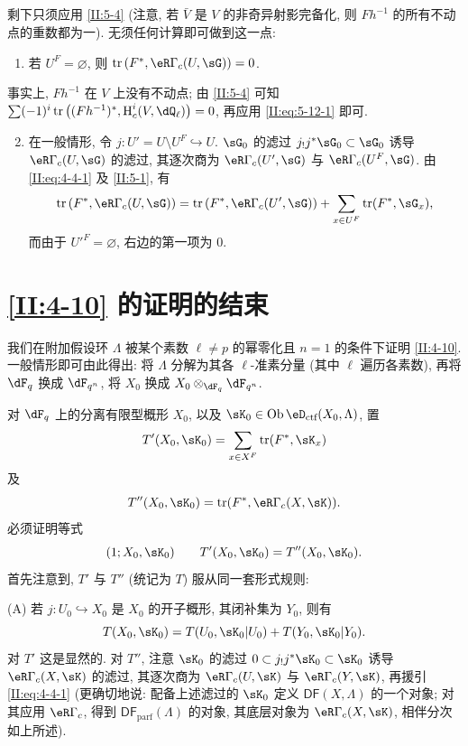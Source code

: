 \subsection{}\label{II:5-13}

剩下只须应用 \ref{II:5-4} (注意, 若 $\bar V$ 是 $V$ 的非奇异射影完备化, 则 $F h^{-1}$ 的所有不动点的重数都为一). 无须任何计算即可做到这一点:
\begin{enumerate}[\indent A.]
  \item 若 $U^F=\varnothing$, 则 $\tr\left(F^*,\eR\Gamma_c(U,\sG)\right) = 0$. \end{enumerate}

事实上, $F h^{-1}$ 在 $V$ 上没有不动点; 由 \ref{II:5-4} 可知 $\sum (-1)^i \tr\left((F h^{-1})^*,\h_c^i(V,\dQ_\ell)\right)=0$, 再应用 \eqref{II:eq:5-12-1} 即可.
\begin{enumerate}[\indent A.]
\setcounter{enumi}{1}
  \item 在一般情形, 令 $j:U'=U\setminus U^F\hookrightarrow U$. $\sG_0$ 的滤过 $j_! j^* \sG_0\subset \sG_0$ 诱导 $\eR\Gamma_c(U,\sG)$ 的滤过, 其逐次商为 $\eR\Gamma_c(U',\sG)$ 与 $\eR\Gamma_c(U^F,\sG)$. 由 \eqref{II:eq:4-4-1} 及 \ref{II:5-1}, 有
    \[
      \tr\left(F^*,\eR\Gamma_c(U,\sG)\right) = \tr\left(F^*,\eR\Gamma_c(U',\sG)\right) + \sum_{x\in U^F} \tr(F^*,\sG_x) \text{,}
    \]
    而由于 ${U'}^F=\varnothing$, 右边的第一项为 $0$.
\end{enumerate}

\section{\ref{II:4-10} 的证明的结束}\label{II:6}

我们在附加假设环 $\Lambda$ 被某个素数 $\ell\ne p$ 的幂零化且 $n=1$ 的条件下证明 \ref{II:4-10}. 一般情形即可由此得出: 将 $\Lambda$ 分解为其各 $\ell$-准素分量 (其中 $\ell$ 遍历各素数), 再将 $\dF_q$ 换成 $\dF_{q^n}$, 将 $X_0$ 换成 $X_0\otimes_{\dF_q}\dF_{q^n}$.

对 $\dF_q$ 上的分离有限型概形 $X_0$, 以及 $\sK_0\in\ob\eD_\text{ctf}(X_0,\Lambda)$, 置
\[
  T'(X_0,\sK_0) = \sum_{x\in X^F} \tr(F^*,\sK_x)
\]
及
\[
  T''(X_0,\sK_0) = \tr(F^*,\eR\Gamma_c(X,\sK)) \text{.}
\]
必须证明等式
\[
  (1;X_0,\sK_0) \qquad T'(X_0,\sK_0) = T''(X_0,\sK_0) \text{.}
\]
首先注意到, $T'$ 与 $T''$ (统记为 $T$) 服从同一套形式规则:

(A) 若 $j:U_0\hookrightarrow X_0$ 是 $X_0$ 的开子概形, 其闭补集为 $Y_0$, 则有
\[
  T(X_0,\sK_0) = T(U_0,\sK_0|U_0) + T(Y_0,\sK_0|Y_0) \text{.}
\]
对 $T'$ 这是显然的. 对 $T''$, 注意 $\sK_0$ 的滤过 $0\subset j_! j^* \sK_0\subset \sK_0$ 诱导 $\eR\Gamma_c(X,\sK)$ 的滤过, 其逐次商为 $\eR\Gamma_c(U,\sK)$ 与 $\eR\Gamma_c(Y,\sK)$, 再援引 \eqref{II:eq:4-4-1} (更确切地说: 配备上述滤过的 $\sK_0$ 定义 $\mathsf{DF}(X,\Lambda)$ 的一个对象; 对其应用 $\eR\Gamma_c$, 得到 $\mathsf{DF}_\text{parf}(\Lambda)$ 的对象, 其底层对象为 $\eR\Gamma_c(X,\sK)$, 相伴分次如上所述).

